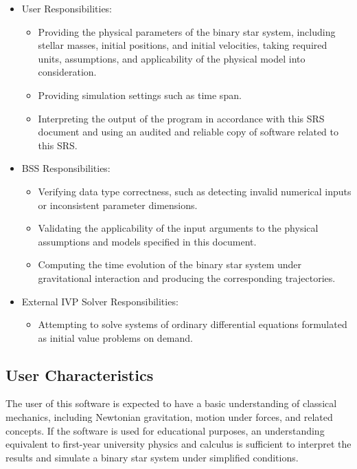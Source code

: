 \documentclass[12pt]{article}
\begin{document}
\begin{itemize}
  \item User Responsibilities:
    \begin{itemize}
      \item Providing the physical parameters of the binary star system,
        including stellar masses, initial positions, and initial velocities,
        taking required units, assumptions, and applicability of the physical
        model into consideration.
      \item Providing simulation settings such as time span.
      \item Interpreting the output of the program in accordance with this SRS
        document and using an audited and reliable copy of software related to
        this SRS.
    \end{itemize} 
\end{itemize}
\begin{itemize}
  \item BSS Responsibilities:
    \begin{itemize}
      \item Verifying data type correctness, such as detecting invalid numerical
        inputs or inconsistent parameter dimensions.
      \item Validating the applicability of the input arguments to the physical
        assumptions and models specified in this document.
      \item Computing the time evolution of the binary star system under
        gravitational interaction and producing the corresponding trajectories.
    \end{itemize} 
\end{itemize}
\begin{itemize}
  \item External IVP Solver Responsibilities:
    \begin{itemize}
      \item Attempting to solve systems of ordinary differential equations
        formulated as initial value problems on demand.
    \end{itemize}
\end{itemize}

\subsection{User Characteristics} \label{SecUserCharacteristics}

The user of this software is expected to have a basic understanding of classical
mechanics, including Newtonian gravitation, motion under forces, and related
concepts. If the software is used for educational purposes, an understanding
equivalent to first-year university physics and calculus is sufficient to
interpret the results and simulate a binary star system under simplified
conditions.
\end{document}
